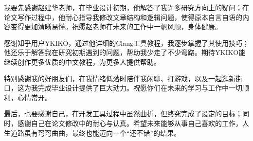 \documentclass[
     oneside,                %
  ]{njuthesis}
\begin{document}
%   
%   












\printbibliography


\begin{acknowledgement}
我要先感谢赵建华老师，在毕业设计初期，他解答了我许多研究方向上的疑问；在论文写作过程中，他耐心指导我修改文章结构和逻辑问题，使得原本自言自语的内容变得更加清晰易懂。祝愿赵老师在未来的工作中一帆风顺，身体健康。

感谢知乎用户YKIKO，通过他详细的Clang工具教程，我逐步掌握了其使用技巧；他还乐于解答我在研究初期遇到的问题，帮助我少走了不少弯路。期待YKIKO能继续创作更多优质的中文教程，为更多人提供帮助。

特别感谢我的好朋友们，在我情绪低落时陪伴我闲聊、打游戏，以及一起逛新街口，这为我完成毕业设计提供了巨大动力。祝愿你们在未来的学习与工作中一切顺利，心情常开。

最后，也要感谢自己，在开发工具过程中虽然曲折，但终究完成了设定的目标；同时，感谢自己在论文修改中的耐心与认真。希望未来能够从事自己喜欢的工作，人生道路虽有弯弯曲曲，最终也能迈向一个“还不错”的结果。
\end{acknowledgement}






\end{document}
